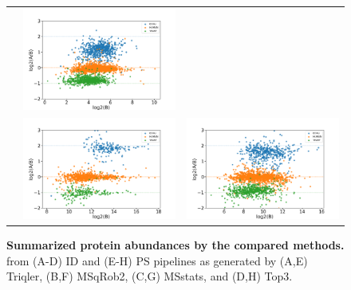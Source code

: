 \documentclass[11pt]{article}
\begin{document}
\begin{figure}[hbt]
\begin{tabular}{   >{\centering\arraybackslash} m{3cm} V V}
                & \includegraphics[width=\linewidth]{../../result/report_plots_pipeline/scatter_PS_msstats.png} \\ 
        {}    & \includegraphics[width=\linewidth]{../../result/report_plots_pipeline/scatter_ID_top3.png}
                & \includegraphics[width=\linewidth]{../../result/report_plots_pipeline/scatter_PS_top3.png} 
    \end{tabular}
    \caption{{\bf Summarized protein abundances by the compared methods.} from (A-D) ID and (E-H) PS pipelines as generated by 
    (A,E) Triqler, (B,F) MSqRob2, (C,G) MSstats, and (D,H) Top3. \label{fig:fc_scatter_supplement}}
\end{figure}
\end{document}
